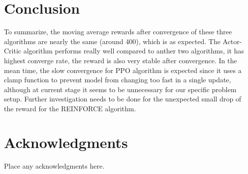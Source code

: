 \documentclass[balance,upint,subscriptcorrection,varvw,mathalfa=cal=boondoxo,pdf-a,colorlinks,nofoot]{asmeconf}
\begin{document}
\section{Conclusion}
\noindent To summarize, the moving average rewards after convergence of these 
three algorithms are nearly the same (around 400), which is as expected. 
The Actor-Critic algorithm performs really well compared to anther two 
algorithms, it has highest converge rate, the reward is also very stable after 
convergence. 
In the mean time, the slow convergence for PPO algorithm is expected since it 
uses a clamp function to prevent model from changing too fast in a single 
update, although at current stage it seems to be unnecessary for our specific 
problem setup. 
Further investigation needs to be done for the unexpected small drop of the 
reward for the REINFORCE algorithm.

\section*{Acknowledgments}
\noindent Place any acknowledgments here.


\nocite{*}%


\end{document}
